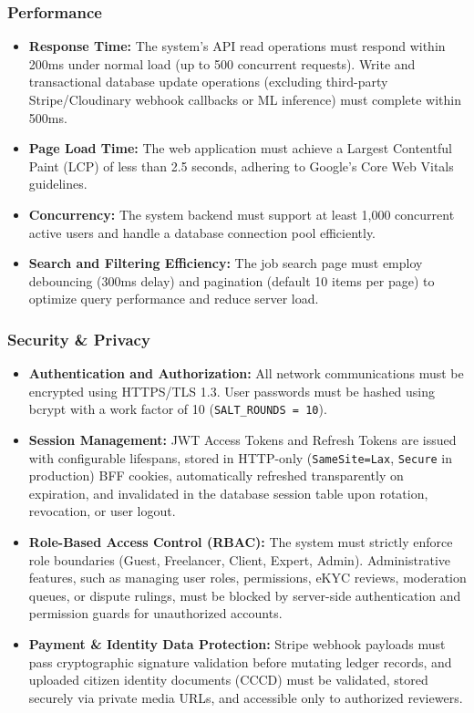 \subsubsection{Performance}
\begin{itemize}
    \item \textbf{Response Time:} The system's API read operations must respond within 200ms under normal load (up to 500 concurrent requests). Write and transactional database update operations (excluding third-party Stripe/Cloudinary webhook callbacks or ML inference) must complete within 500ms.
    \item \textbf{Page Load Time:} The web application must achieve a Largest Contentful Paint (LCP) of less than 2.5 seconds, adhering to Google's Core Web Vitals guidelines.
    \item \textbf{Concurrency:} The system backend must support at least 1,000 concurrent active users and handle a database connection pool efficiently.
    \item \textbf{Search and Filtering Efficiency:} The job search page must employ debouncing (300ms delay) and pagination (default 10 items per page) to optimize query performance and reduce server load.
\end{itemize}

\subsubsection{Security \& Privacy}
\begin{itemize}
    \item \textbf{Authentication and Authorization:} All network communications must be encrypted using HTTPS/TLS 1.3. User passwords must be hashed using bcrypt with a work factor of 10 (\texttt{SALT\_ROUNDS = 10}).
    \item \textbf{Session Management:} JWT Access Tokens and Refresh Tokens are issued with configurable lifespans, stored in HTTP-only (\texttt{SameSite=Lax}, \texttt{Secure} in production) BFF cookies, automatically refreshed transparently on expiration, and invalidated in the database session table upon rotation, revocation, or user logout.
    \item \textbf{Role-Based Access Control (RBAC):} The system must strictly enforce role boundaries (Guest, Freelancer, Client, Expert, Admin). Administrative features, such as managing user roles, permissions, eKYC reviews, moderation queues, or dispute rulings, must be blocked by server-side authentication and permission guards for unauthorized accounts.
    \item \textbf{Payment \& Identity Data Protection:} Stripe webhook payloads must pass cryptographic signature validation before mutating ledger records, and uploaded citizen identity documents (CCCD) must be validated, stored securely via private media URLs, and accessible only to authorized reviewers.
\end{itemize}
